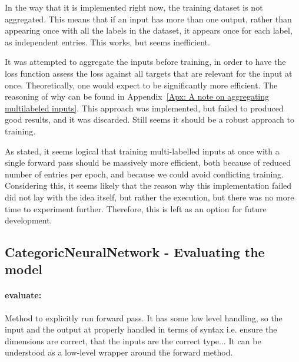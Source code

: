 \documentclass[a4paper, 11pt]{report}
\begin{document}
    \begin{tcolorbox}[title=Failed Approach: Train all labels in multi-labelled input at once, colback=white,colframe=red!60!black]
    In the way that it is implemented right now, the training dataset is not aggregated. This means that if an input has more than one output, rather than appearing once with all the labels in the dataset, it appears once for each label, as independent entries. This works, but seems inefficient.

    It was attempted to aggregate the inputs before training, in order to have the loss function assess the loss against all targets that are relevant for the input at once. Theoretically, one would expect to be significantly more efficient. The reasoning of why can be found in Appendix~\ref{Apx: A note on aggregating multilabeled inputs}. This approach was implemented, but failed to produced good results, and it was discarded. Still seems it should be a robust approach to training.
        \begin{tcolorbox}[title=Future Development: Find a way to train multi-labelled inputs in one single forward pass, colback=white, colframe=green!40!black]
        As stated, it seems logical that training multi-labelled inputs at once with a single forward pass should be massively more efficient, both because of reduced number of entries per epoch, and because we could avoid conflicting training. Considering this, it seems likely that the reason why this implementation failed did not lay with the idea itself, but rather the execution, but there was no more time to experiment further. Therefore, this is left as an option for future development.
        \end{tcolorbox}
    \end{tcolorbox}
    \subsection{CategoricNeuralNetwork - Evaluating the model}\label{Section: Methodology_NN_exec}

    \paragraph{evaluate:} Method to explicitly run forward pass. It has some low level handling, so the input and the output at properly handled in terms of syntax i.e. ensure the dimensions are correct, that the inputs are the correct type... It can be understood as a low-level wrapper around the forward method.
\end{document}
